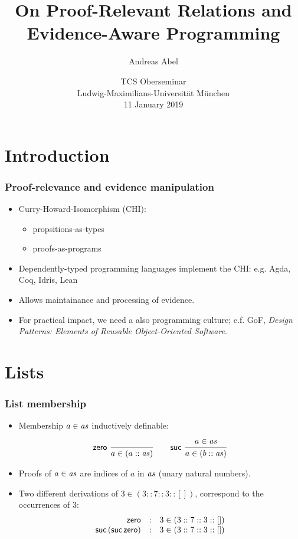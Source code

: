 \documentclass[t,fleqn,usenames,dvipsnames]{beamer}
\title[Proof-Relevant Relations]{%
On Proof-Relevant Relations and Evidence-Aware Programming}
\author[Abel]{
  Andreas Abel\inst{1}
}
\institute[] %
{
  \inst{1}
  Department of Computer Science and Engineering\\
  Chalmers and Gothenburg University, Sweden \\[1ex]
}
\date[OSem Jan 2019] %
{ TCS Oberseminar \\
  Ludwig-Maximilians-Universität München \\
  11 January 2019
}
\newcommand{\cAnn}{\color{red!80!black}}%
\renewcommand{\emph}[1]{{\cAnn#1}}
\newcommand{\cType}{\color{orange!60!black}}
\renewcommand{\emph}[1]{\textit{\cType#1}}
\begin{document}
\maketitle




\section{Introduction}

\begin{frame}%
  \frametitle{Proof-relevance and evidence manipulation}
  \vspace{-3ex}
  \begin{itemize}
  \item Curry-Howard-Isomorphism (CHI):
    \begin{itemize}
    \item propsitions-as-types
    \item proofs-as-programs
    \end{itemize}
  \item Dependently-typed programming languages implement the CHI:
    e.g. Agda, Coq, Idris, Lean
  \item Allows maintainance and processing of evidence.
  \item For practical impact, we need a also programming culture;
    c.f. GoF, \emph{Design Patterns: Elements of Reusable Object-Oriented Software}.
  \end{itemize}
\end{frame}

\section{Lists}


\begin{frame}%
  \frametitle{List membership}
  \vspace{-3ex}
  \begin{itemize}
  \item Membership $a \in \mathit{as}$ inductively definable:
\[
  \nru{\tzero}{}{a \in (a :: \vas)}
\qquad
  \nru{\tsuc}{a \in \vas}{a \in (b :: \vas)}
\]
  \item Proofs of $a \in \mathit{as}$ are indices of $a$ in $\mathit{as}$ (unary
    natural numbers).
  \item Two different derivations of $3 \in (3 :: 7 :: 3 :: [])$,
  correspond to the occurrences of $3$:
\[
  \begin{array}{rcl}
\mathsf{zero} & : & 3 \in (3 :: 7 :: 3 :: []) \\
\mathsf{\mathsf{suc}\,(\mathsf{\mathsf{suc}\,\mathsf{zero}})}  & : & 3 \in (3 :: 7 :: 3 :: []) \\
  \end{array}
\]
  \end{itemize}
\end{frame}
\end{document}
